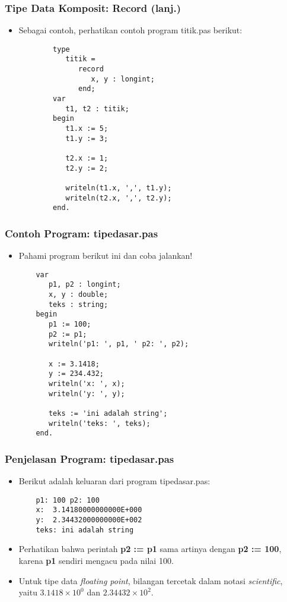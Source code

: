 \documentclass{beamer}
\begin{document}
\begin{frame}[fragile]
\frametitle{Tipe Data Komposit: Record (lanj.)}
\begin{itemize}
	\item Sebagai contoh, perhatikan contoh program titik.pas berikut:
	\begin{lstlisting}
		type
		   titik = 
		      record
		         x, y : longint;
		      end;
		var
		   t1, t2 : titik;
		begin
		   t1.x := 5;
		   t1.y := 3;
		
		   t2.x := 1;
		   t2.y := 2;
		
		   writeln(t1.x, ',', t1.y);
		   writeln(t2.x, ',', t2.y);
		end.
	\end{lstlisting}
\end{itemize}
\end{frame}

\begin{frame}[fragile]
\frametitle{Contoh Program: tipedasar.pas}
\begin{itemize}
	\item Pahami program berikut ini dan coba jalankan!
	\begin{lstlisting}
	var
	   p1, p2 : longint;
	   x, y : double;
	   teks : string;
	begin
	   p1 := 100;
	   p2 := p1;
	   writeln('p1: ', p1, ' p2: ', p2);
	   
	   x := 3.1418;
	   y := 234.432;
	   writeln('x: ', x);
	   writeln('y: ', y);
	   
	   teks := 'ini adalah string';
	   writeln('teks: ', teks);
	end.
	\end{lstlisting}
\end{itemize}
\end{frame}

\begin{frame}[fragile]
\frametitle{Penjelasan Program: tipedasar.pas}
\begin{itemize}
	\item Berikut adalah keluaran dari program tipedasar.pas:
	\begin{lstlisting}
	p1: 100 p2: 100
	x:  3.14180000000000E+000
	y:  2.34432000000000E+002
	teks: ini adalah string
	\end{lstlisting}
	\item Perhatikan bahwa perintah \textbf{p2 := p1} sama artinya dengan \textbf{p2 := 100}, karena \textbf{p1} sendiri mengacu pada nilai 100.
	\item Untuk tipe data \textit{floating point}, bilangan tercetak dalam notasi \textit{scientific}, yaitu $3.1418 \times 10^{0}$ dan $2.34432 \times 10^{2}$.
\end{itemize}
\end{frame}
\end{document}

